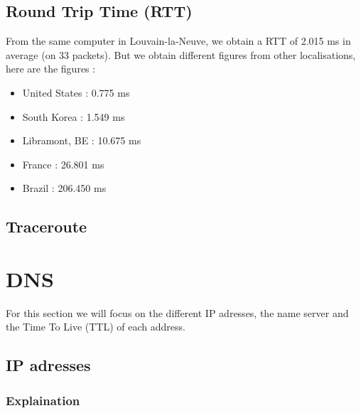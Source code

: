 \documentclass{article}
\begin{document}



\subsection{Round Trip Time (RTT)}
\label{sub:rtt}

From the same computer in Louvain-la-Neuve, we obtain a RTT of 2.015 ms in average (on 33 packets). But we obtain different figures from other localisations, here are the figures : 
\begin{itemize}
    \itemsep-0.1em 
    \item United States :  0.775 ms
    \item South Korea : 1.549 ms
    \item Libramont, BE : 10.675 ms
    \item France : 26.801 ms
    \item Brazil : 206.450 ms
\end{itemize}

\subsection{Traceroute}
\label{sub:trace}

\section{DNS}
\label{sec:DNS}


For this section we will focus on the different IP adresses, the name server and the Time To Live (TTL) of each address.

\subsection{IP adresses}

\subsubsection{Explaination}
\label{subsub:ipexp}
\end{document}

